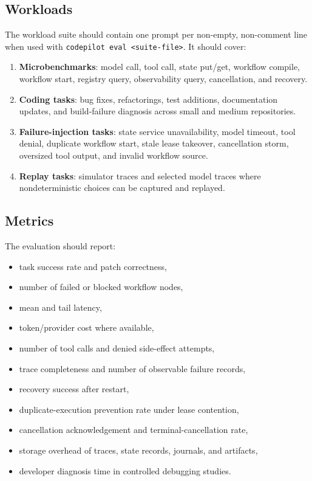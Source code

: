 \documentclass[manuscript,screen,review]{acmart}
\begin{document}
\subsection{Workloads}

The workload suite should contain one prompt per non-empty, non-comment line
when used with \texttt{codepilot eval <suite-file>}. It should cover:

\begin{enumerate}
  \item \textbf{Microbenchmarks}: model call, tool call, state put/get, workflow
  compile, workflow start, registry query, observability query, cancellation,
  and recovery.
  \item \textbf{Coding tasks}: bug fixes, refactorings, test additions,
  documentation updates, and build-failure diagnosis across small and medium
  repositories.
  \item \textbf{Failure-injection tasks}: state service unavailability, model
  timeout, tool denial, duplicate workflow start, stale lease takeover,
  cancellation storm, oversized tool output, and invalid workflow source.
  \item \textbf{Replay tasks}: simulator traces and selected model traces where
  nondeterministic choices can be captured and replayed.
\end{enumerate}

\subsection{Metrics}

The evaluation should report:

\begin{itemize}
  \item task success rate and patch correctness,
  \item number of failed or blocked workflow nodes,
  \item mean and tail latency,
  \item token/provider cost where available,
  \item number of tool calls and denied side-effect attempts,
  \item trace completeness and number of observable failure records,
  \item recovery success after restart,
  \item duplicate-execution prevention rate under lease contention,
  \item cancellation acknowledgement and terminal-cancellation rate,
  \item storage overhead of traces, state records, journals, and artifacts,
  \item developer diagnosis time in controlled debugging studies.
\end{itemize}
\end{document}
